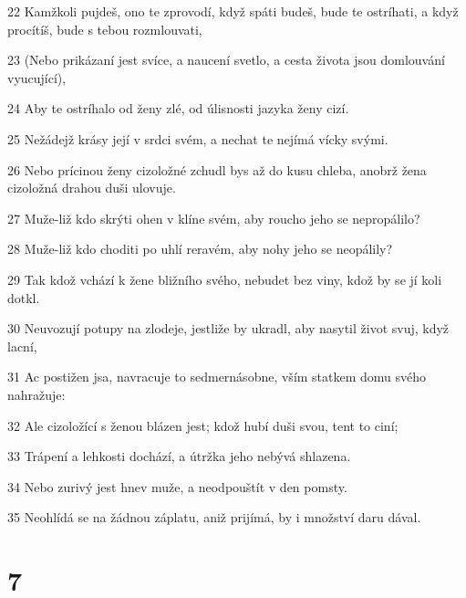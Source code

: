\par 22 Kamžkoli pujdeš, ono te zprovodí, když spáti budeš, bude te ostríhati, a když procítíš, bude s tebou rozmlouvati,
\par 23 (Nebo prikázaní jest svíce, a naucení svetlo, a cesta života jsou domlouvání vyucující),
\par 24 Aby te ostríhalo od ženy zlé, od úlisnosti jazyka ženy cizí.
\par 25 Nežádejž krásy její v srdci svém, a nechat te nejímá vícky svými.
\par 26 Nebo prícinou ženy cizoložné zchudl bys až do kusu chleba, anobrž žena cizoložná drahou duši ulovuje.
\par 27 Muže-liž kdo skrýti ohen v klíne svém, aby roucho jeho se nepropálilo?
\par 28 Muže-liž kdo choditi po uhlí reravém, aby nohy jeho se neopálily?
\par 29 Tak kdož vchází k žene bližního svého, nebudet bez viny, kdož by se jí koli dotkl.
\par 30 Neuvozují potupy na zlodeje, jestliže by ukradl, aby nasytil život svuj, když lacní,
\par 31 Ac postižen jsa, navracuje to sedmernásobne, vším statkem domu svého nahražuje:
\par 32 Ale cizoložící s ženou blázen jest; kdož hubí duši svou, tent to ciní;
\par 33 Trápení a lehkosti dochází, a útržka jeho nebývá shlazena.
\par 34 Nebo zurivý jest hnev muže, a neodpouštít v den pomsty.
\par 35 Neohlídá se na žádnou záplatu, aniž prijímá, by i množství daru dával.

\chapter{7}

